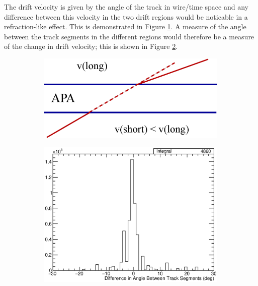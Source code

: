 The drift velocity is given by the angle of the track in wire/time space and any difference between this velocity in the two drift regions would be noticable in a refraction-like effect.  This is demonstrated in Figure \ref{fig:DriftVelocityDiffGeo}.  A measure of the angle between the track segments in the different regions would therefore be a measure of the change in drift velocity; this is shown in Figure \ref{fig:DriftVelocityDiffRes}.

\begin{figure}
  \centering
  \begin{subfigure}[t]{0.48\linewidth}
    \centering
    \includegraphics[width=\textwidth]{DriftVelocityDiffGeo.eps}
    \caption{}
    \label{fig:DriftVelocityDiffGeo}
  \end{subfigure}
  \hfill
  \begin{subfigure}[t]{0.48\linewidth}
    \centering
    \includegraphics[width=\textwidth]{DriftVelocityDiffRes.eps}
    \caption{}
    \label{fig:DriftVelocityDiffRes}
  \end{subfigure}
  \caption[]{}
  \label{fig:DriftVelocityDiff}
\end{figure}


